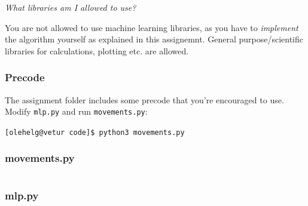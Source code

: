 \noindent
\textit{What libraries am I allowed to use?}

You are not allowed to use machine learning libraries,
as you have to \emph{implement} the algorithm yourself as explained in this assignemnt.
General purpose/scientific libraries for calculations, plotting etc. are allowed.

\subsubsection*{Precode}
The assignment folder includes some precode that you're encouraged to use.
Modify \texttt{mlp.py} and run \texttt{movements.py}:
\begin{center}
    \texttt{[olehelg@vetur code]\$ python3 movements.py}
\end{center}

\subsubsection*{movements.py}
\inputminted{Python}{./code/movements.py}

\subsubsection*{mlp.py}
\inputminted{Python}{./code/mlp.py}




